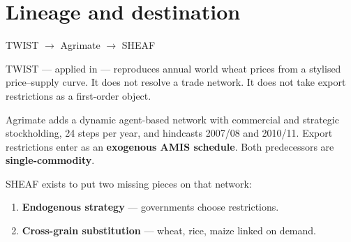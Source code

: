 \section{Lineage and destination}

\begin{frame}[label=lineage]{TWIST $\to$ Agrimate $\to$ SHEAF}

TWIST \citep{schewe2017} --- applied in \citet{falkendal2021} ---
reproduces annual world wheat prices from a stylised price--supply curve.
It does not resolve a trade network. It does not take export restrictions
as a first-order object.

Agrimate \citep{kuhla2025} adds a dynamic agent-based network with
commercial and strategic stockholding, 24 steps per year, and hindcasts
2007/08 and 2010/11. Export restrictions enter as an \textbf{exogenous
AMIS schedule}. Both predecessors are \textbf{single-commodity}.

SHEAF exists to put two missing pieces on that network:
\begin{enumerate}
\item \textbf{Endogenous strategy} --- governments choose restrictions.
\item \textbf{Cross-grain substitution} --- wheat, rice, maize linked on demand.
\end{enumerate}
\end{frame}

